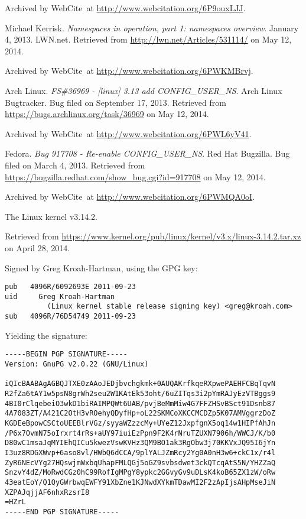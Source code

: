 \begin{thebibliography}{9}
Archived by WebCite\textsuperscript{\textregistered}\ at
\url{http://www.webcitation.org/6P9ouxLJJ}.


Michael Kerrisk. \emph{Namespaces in operation, part 1: namespaces overview}.
January 4, 2013. LWN.net. Retrieved from \url{http://lwn.net/Articles/531114/}
on May 12, 2014.

Archived by WebCite\textsuperscript{\textregistered}\ at
\url{http://www.webcitation.org/6PWKMBrvj}.


Arch Linux. \emph{FS\#36969 - [linux] 3.13 add CONFIG\_USER\_NS}. Arch Linux
Bugtracker. Bug filed on September 17, 2013. Retrieved from
\url{https://bugs.archlinux.org/task/36969} on May 12, 2014.

Archived by WebCite\textsuperscript{\textregistered}\ at
\url{http://www.webcitation.org/6PWL6yV41}.


Fedora. \emph{Bug 917708 - Re-enable CONFIG\_USER\_NS}. Red Hat Bugzilla. Bug
filed on March 4, 2013. Retrieved from
\url{https://bugzilla.redhat.com/show_bug.cgi?id=917708} on May 12, 2014.

Archived by WebCite\textsuperscript{\textregistered}\ at
\url{http://www.webcitation.org/6PWMQA0oI}.


The Linux kernel v3.14.2.

Retrieved from
\url{https://www.kernel.org/pub/linux/kernel/v3.x/linux-3.14.2.tar.xz} on April
28, 2014.

Signed by Greg Kroah-Hartman, using the GPG key:

\begin{lstlisting}
pub   4096R/6092693E 2011-09-23
uid     Greg Kroah-Hartman
          (Linux kernel stable release signing key) <greg@kroah.com>
sub   4096R/76D54749 2011-09-23
\end{lstlisting}

Yielding the signature:

\begin{lstlisting}
-----BEGIN PGP SIGNATURE-----
Version: GnuPG v2.0.22 (GNU/Linux)

iQIcBAABAgAGBQJTXE0zAAoJEDjbvchgkmk+0AUQAKrfkqeRXpwePAEHFCBqTqvN
R2fZa6tAY1w5psN8grWh2seu2W1KAtEk53oht/6uZITqs3i2pYmRAJyEzVTBggs9
4BI0rClqebeiO3wkD1biRAIMPQWt6UAB/pvjBeMmMiw4G7FFZHSvBSct91Dsnb87
4A7083ZT/A421C2OtH3vROehyQDyfHp+oL22SKMCoXKCCMCDZp5K07AMVggrzDoZ
KGDEeBpowCSCtoUEEBlrVGz/syyaWZzzcMy+UYeZ12JxpfgnX5oq14w1HIPfAhJn
/P6x7OvmN75oIrxrt4rRs+aUY97iuiEzPpn9F2K4rNruTZUXN7906h/WWCJ/K/b0
D80wC1msaJqMYIEhQICu5kwezVswKVHz3QM9BO1ak3RgObw3j70KKVxJQ95I6jYn
I3uz8RDGXWvp+6aso8vl/HWbQ6dCCA/9plYALJZmRcy2Yg0A0nH3w6+ckC1x/r4l
ZyR6NEcVYg27HQswjmWxbqUhapFMLQGj5oGZ9svbsdwet3ckQTcqAtS5N/YHZZaQ
SnzvY4dZ/MoRwdCGz0hC99RofIgMPgY8ypkc2GGvyGv9uDLsK4koB65ZX1zW/oRw
43eatEoY/Q1QyGWrbwqEWFY91XbZne1KJNwdXYkmTDawMI2F2zApIjsAHpMseJiN
XZPAJqjjAF6nhxRzsrI8
=HZrL
-----END PGP SIGNATURE-----
\end{lstlisting}


\end{thebibliography}
